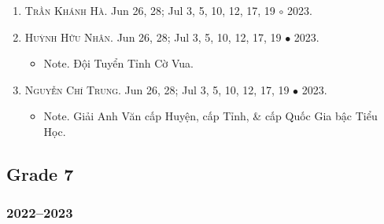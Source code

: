\documentclass{article}
\begin{document}
\begin{enumerate}
	\item \textsc{Trần Khánh Hà.} {\sf[In]} Jun 26, 28; Jul 3, 5, 10, 12, 17, 19 $\circ$ 2023. 
	\item \textsc{Huỳnh Hữu Nhân.} {\sf[In]} Jun 26, 28; Jul 3, 5, 10, 12, 17, 19 $\bullet$ 2023.
	\begin{itemize}
		\item {\sf Note.} Đội Tuyển Tỉnh Cờ Vua.
	\end{itemize}
	\item \textsc{Nguyễn Chí Trung.} {\sf[In]} Jun 26, 28; Jul 3, 5, 10, 12, 17, 19 $\bullet$ 2023.
	\begin{itemize}
		\item {\sf Note.} Giải Anh Văn cấp Huyện, cấp Tỉnh, \& cấp Quốc Gia bậc Tiểu Học.
	\end{itemize}
\end{enumerate}


\subsection{Grade 7}

\subsubsection{2022--2023}
\end{document}
